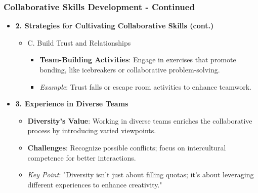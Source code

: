 \documentclass[aspectratio=169]{beamer}
\begin{document}
\begin{frame}[fragile]
    \frametitle{Collaborative Skills Development - Continued}
    \begin{itemize}
        \item \textbf{2. Strategies for Cultivating Collaborative Skills (cont.)}
        \begin{itemize}
            \item C. Build Trust and Relationships 
                \begin{itemize}
                    \item \textbf{Team-Building Activities}: Engage in exercises that promote bonding, like icebreakers or collaborative problem-solving.
                    \item \textit{Example}: Trust falls or escape room activities to enhance teamwork.
                \end{itemize}
        \end{itemize}
        
        \item \textbf{3. Experience in Diverse Teams}
        \begin{itemize}
            \item \textbf{Diversity's Value}: Working in diverse teams enriches the collaborative process by introducing varied viewpoints.
            \item \textbf{Challenges}: Recognize possible conflicts; focus on intercultural competence for better interactions.
            \item \textit{Key Point}: "Diversity isn't just about filling quotas; it's about leveraging different experiences to enhance creativity."
        \end{itemize}
    \end{itemize}
\end{frame}
\end{document}
